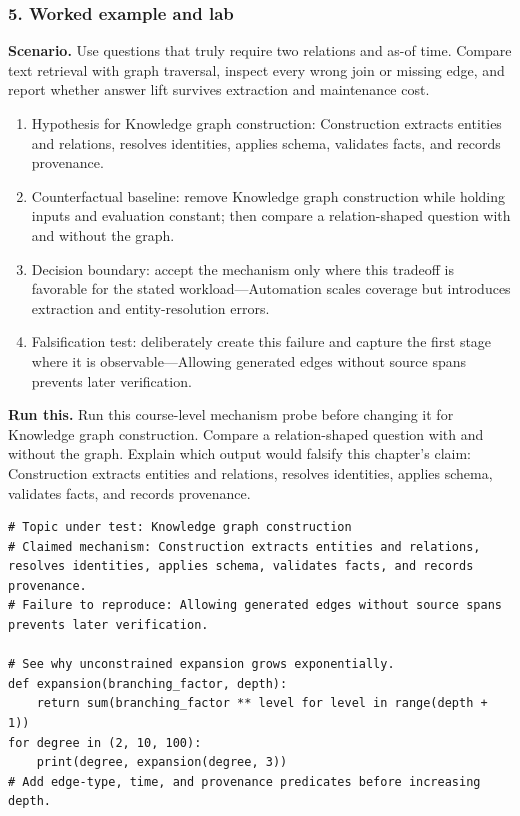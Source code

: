 \subsubsection*{5. Worked example and lab}
\textbf{Scenario.} Use questions that truly require two relations and as-of time. Compare text retrieval with graph traversal, inspect every wrong join or missing edge, and report whether answer lift survives extraction and maintenance cost.
\begin{enumerate}
\item Hypothesis for Knowledge graph construction: Construction extracts entities and relations, resolves identities, applies schema, validates facts, and records provenance.
\item Counterfactual baseline: remove Knowledge graph construction while holding inputs and evaluation constant; then compare a relation-shaped question with and without the graph.
\item Decision boundary: accept the mechanism only where this tradeoff is favorable for the stated workload—Automation scales coverage but introduces extraction and entity-resolution errors.
\item Falsification test: deliberately create this failure and capture the first stage where it is observable—Allowing generated edges without source spans prevents later verification.
\end{enumerate}
\textbf{Run this.} Run this course-level mechanism probe before changing it for Knowledge graph construction. Compare a relation-shaped question with and without the graph. Explain which output would falsify this chapter's claim: Construction extracts entities and relations, resolves identities, applies schema, validates facts, and records provenance.
\begin{Verbatim}[fontsize=\scriptsize]
# Topic under test: Knowledge graph construction
# Claimed mechanism: Construction extracts entities and relations, resolves identities, applies schema, validates facts, and records provenance.
# Failure to reproduce: Allowing generated edges without source spans prevents later verification.

# See why unconstrained expansion grows exponentially.
def expansion(branching_factor, depth):
    return sum(branching_factor ** level for level in range(depth + 1))
for degree in (2, 10, 100):
    print(degree, expansion(degree, 3))
# Add edge-type, time, and provenance predicates before increasing depth.
\end{Verbatim}

